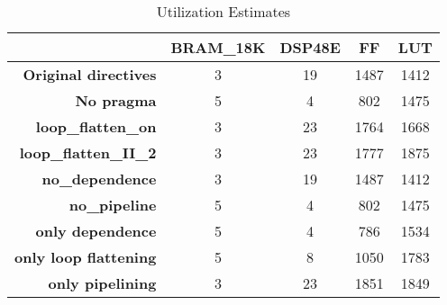 



\begin{table}[htbp]
\begin{center}
\begin{tabular}{rcccc}
\toprule
 & \textbf{BRAM\_18K} & \textbf{DSP48E} & \textbf{FF} & \textbf{LUT}\\ \midrule
\textbf{Original directives} & 3 & 19 & 1487 & 1412 \\ 
\textbf{No pragma} & 5 & 4 & 802 & 1475 \\ 
\textbf{loop\_flatten\_on} & 3 & 23 & 1764 & 1668 \\ 
\textbf{loop\_flatten\_II\_2} & 3 & 23 & 1777 & 1875 \\ 
\textbf{no\_dependence} & 3 & 19 & 1487 & 1412 \\ 
\textbf{no\_pipeline} & 5 & 4 & 802 & 1475 \\ 
\textbf{only dependence} & 5 & 4 & 786 & 1534 \\ 
\textbf{only loop flattening} & 5 & 8 & 1050 & 1783 \\ 
\textbf{only pipelining} & 3 & 23 & 1851 & 1849 \\ \bottomrule
\end{tabular}
\end{center}
\caption{Utilization Estimates}
\label{tab:utilization_estimates}
\end{table}


